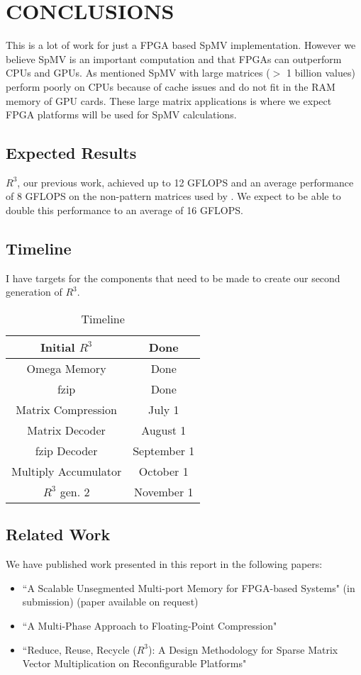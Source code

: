 \chapter{CONCLUSIONS}
\label{chp:conclusion}
This is a lot of work for just a FPGA based SpMV implementation. However we believe SpMV is an important computation and that FPGAs can outperform CPUs and GPUs. As mentioned SpMV with large matrices ($>$ 1 billion values) perform poorly on CPUs because of cache issues and do not fit in the RAM memory of GPU cards. These large matrix applications is where we expect FPGA platforms will be used for SpMV calculations.
\section{Expected Results}
\label{chapter:expected}
$R^3$, our previous work, achieved up to 12 GFLOPS and an average performance of 8 GFLOPS on the non-pattern matrices used by \cite{prelim:bell}. We expect to be able to double this performance to an average of 16 GFLOPS.

\section{Timeline}
I have targets for the components that need to be made to create our second generation of $R^3$.

\begin{table*}
\caption{Timeline}
\label{tbl:timeline}
\centering
\begin{tabular}{|c|c|}
\hline
Initial $R^3$ & Done \\
\hline
Omega Memory & Done \\
\hline
fzip & Done \\
\hline
Matrix Compression & July 1 \\
\hline
Matrix Decoder & August 1\\
\hline
fzip Decoder & September 1 \\
\hline
Multiply Accumulator & October 1 \\
\hline
$R^3$ gen. 2 & November 1 \\
\hline
\end{tabular}
\end{table*}
\section{Related Work}
We have published work presented in this report in the following papers:
\begin{itemize}
    \item ``A Scalable Unsegmented Multi-port Memory for FPGA-based Systems" (in submission) (paper available on request)
    \item ``A Multi-Phase Approach to Floating-Point Compression" \cite{prelim:townsend3}
    \item ``Reduce, Reuse, Recycle ($R^3$): A Design Methodology for Sparse Matrix Vector Multiplication on Reconfigurable Platforms" \cite{prelim:townsend}
\end{itemize}
